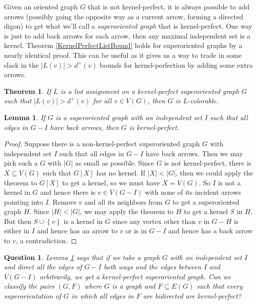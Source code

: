 \documentclass{tufte-book} %
\theoremstyle{plain}
\newtheorem{lemma}{Lemma}
\newtheorem{question}{Question}
\newtheorem{theorem}{Theorem}
\newcommand{\set}[1]{\left\{ #1 \right\}}
\newcommand{\card}[1]{\left|#1\right|}
\begin{document}
Given an oriented graph $G$ that is not kernel-perfect, it is always possible to add arrows (possibly going the opposite way as a current arrow, forming a directed digon) 
to get what we'll call a \emph{superoriented graph} that is kernel-perfect.  One way is just to add back arrows for each arrow, then any maximal independent set is a kernel.
Theorem \ref{KernelPerfectListBound} holds for superoriented graphs by a nearly identical proof.  
This can be useful as it gives us a way to trade in some slack in the $\card{L(v)} > d^+(v)$ bounds for kernel-perfection by adding some extra arrows.\marginnote{\textcolor{blue}{example, picture}}

\begin{theorem}\label{KernelPerfectSuperListBound}
If $L$ is a list assignment on a kernel-perfect superoriented graph $G$ such that $\card{L(v)} > d^+(v)$ for all $v \in V(G)$, then $G$ is $L$-colorable.
\end{theorem}

\begin{lemma}\label{KostochkaYanceyKernelLemma}
If $G$ is a superoriented graph with an independent set $I$ such that all edges in $G-I$ have back arrows, then $G$ is kernel-perfect.
\end{lemma}
\begin{proof}
Suppose there is a non-kernel-perfect superoriented graph $G$ with independent set $I$ such that all edges in $G-I$ have back arrows.  Then we may pick such a $G$ with $\card{G}$
as small as possible.  Since $G$ is not kernel-perfect, there is $X \subseteq V(G)$ such that $G[X]$ has no kernel.  If $\card{X} < \card{G}$, 
then we could apply the theorem to $G[X]$ to get a kernel, so we must have $X = V(G)$.  So $I$ is not a kernel in $G$ and hence there is $v \in V(G-I)$ 
with none of its incident arrows pointing into $I$.  Remove $v$ and all its neighbors from $G$ to get a superoriented graph $H$. Since $\card{H} < \card{G}$, we may apply the
theorem to $H$ to get a kernel $S$ in $H$.  But then $S \cup \set{v}$ is a kernel in $G$ since any vertex other than $v$ in $G-H$ is either in $I$ and hence 
has an arrow to $v$ or is in $G-I$ and hence has a back arrow to $v$, a contradiction.
\end{proof}

\begin{question}
Lemma \ref{KostochkaYanceyKernelLemma} says that if we take a graph $G$ with an independent set $I$ and direct all the edges of $G-I$ both ways and the edges 
between $I$ and $V(G-I)$ arbitrarily, we get a kernel-perfect superoriented graph.  Can we classify the pairs $(G, F)$ where $G$ is a graph and $F \subseteq E(G)$ such that
every superorientation of $G$ in which all edges in $F$ are bidirected are kernel-perfect?  \marginnote{\textcolor{blue}{examples}}
\end{question}
\end{document}
